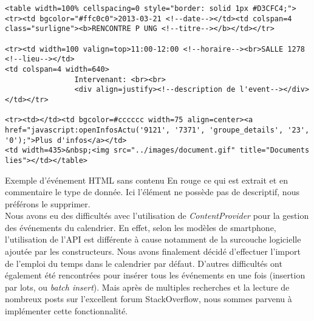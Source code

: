 \begin{adjustbox}{minipage=1.14\textwidth,margin=0pt \smallskipamount,center}
\begin{lstlisting}[style=XML, label=htmlCode]
<table width=100% cellspacing=0 style="border: solid 1px #D3CFC4;"><tr><td bgcolor="#ffc0c0">2013-03-21 <!--date--></td><td colspan=4 class="surligne"><b>RENCONTRE P UNG <!--titre--></b></td></tr>

<tr><td width=100 valign=top>11:00-12:00 <!--horaire--><br>SALLE 1278 <!--lieu--></td>
<td colspan=4 width=640>
	            Intervenant: <br><br>
				<div align=justify><!--description de l'event--></div></td></tr>

<tr><td></td><td bgcolor=#cccccc width=75 align=center><a href="javascript:openInfosActu('9121', '7371', 'groupe_details', '23', '0');">Plus d'infos</a></td>
<td width=435>&nbsp;<img src="../images/document.gif" title="Documents lies"></td></table>
\end{lstlisting}
\end{adjustbox}

Exemple d'événement HTML sans contenu
En rouge ce qui est extrait et en commentaire le type de donnée. Ici l’élément ne possède pas de descriptif, nous préférons le supprimer. \\

Nous avons eu des difficultés avec l’utilisation de \emph{ContentProvider} pour la gestion des événements du calendrier. En effet, selon les modèles de smartphone, l’utilisation de l’API est différente à cause notamment de la surcouche logicielle ajoutée par les constructeurs. Nous avons finalement décidé d’effectuer l’import de l’emploi du temps dans le calendrier par défaut. D’autres difficultés ont également été rencontrées pour insérer tous les événements en une fois (insertion par lots, ou \emph{batch insert}). Mais après de multiples recherches et la lecture de nombreux posts sur l’excellent forum StackOverflow, nous sommes parvenu à implémenter cette fonctionnalité.

